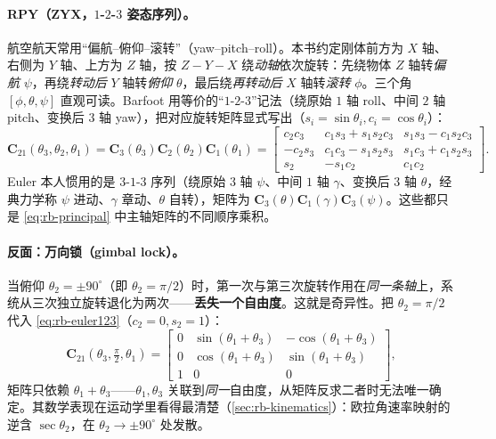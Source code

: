 \paragraph{RPY（ZYX，$1$-$2$-$3$ 姿态序列）。}航空航天常用“偏航--俯仰--滚转”（yaw--pitch--roll）。本书约定刚体前方为 $X$ 轴、右侧为 $Y$ 轴、上方为 $Z$ 轴，按 $Z\!-\!Y\!-\!X$ 绕\emph{动轴}依次旋转\cite{gaoxiang2019slam14}：先绕物体 $Z$ 轴转\emph{偏航} $\psi$，再绕\emph{转动后} $Y$ 轴转\emph{俯仰} $\theta$，最后绕\emph{再转动后} $X$ 轴转\emph{滚转} $\phi$。三个角 $[\phi,\theta,\psi]$ 直观可读。Barfoot 用等价的“$1$-$2$-$3$”记法（绕原始 $1$ 轴 roll、中间 $2$ 轴 pitch、变换后 $3$ 轴 yaw），把对应旋转矩阵显式写出\cite{barfoot2024state}（$s_i=\sin\theta_i,c_i=\cos\theta_i$）：
\begin{equation}
  \mathbf{C}_{21}(\theta_3,\theta_2,\theta_1)=\mathbf{C}_3(\theta_3)\mathbf{C}_2(\theta_2)\mathbf{C}_1(\theta_1)
  =\begin{bmatrix}
  c_2c_3 & c_1s_3+s_1s_2c_3 & s_1s_3-c_1s_2c_3\\
  -c_2s_3 & c_1c_3-s_1s_2s_3 & s_1c_3+c_1s_2s_3\\
  s_2 & -s_1c_2 & c_1c_2
  \end{bmatrix}.
  \label{eq:rb-euler123}
\end{equation}
Euler 本人惯用的是 $3$-$1$-$3$ 序列（绕原始 $3$ 轴 $\psi$、中间 $1$ 轴 $\gamma$、变换后 $3$ 轴 $\theta$，经典力学称 $\psi$ 进动、$\gamma$ 章动、$\theta$ 自转），矩阵为 $\mathbf{C}_3(\theta)\mathbf{C}_1(\gamma)\mathbf{C}_3(\psi)$。这些都只是 \cref{eq:rb-principal} 中主轴矩阵的不同顺序乘积。

\paragraph{反面：万向锁（gimbal lock）。}当俯仰 $\theta_2=\pm90^\circ$（即 $\theta_2=\pi/2$）时，第一次与第三次旋转作用在\emph{同一条轴}上，系统从三次独立旋转退化为两次——\textbf{丢失一个自由度}。这就是奇异性。把 $\theta_2=\pi/2$ 代入 \cref{eq:rb-euler123}（$c_2=0,s_2=1$）：
\begin{equation}
  \mathbf{C}_{21}(\theta_3,\tfrac{\pi}{2},\theta_1)=\begin{bmatrix}
  0&\sin(\theta_1+\theta_3)&-\cos(\theta_1+\theta_3)\\
  0&\cos(\theta_1+\theta_3)&\sin(\theta_1+\theta_3)\\
  1&0&0\end{bmatrix},
\end{equation}
矩阵只依赖 $\theta_1+\theta_3$——$\theta_1,\theta_3$ 关联到\emph{同一}自由度，从矩阵反求二者时无法唯一确定\cite{barfoot2024state}。其数学表现在运动学里看得最清楚（\cref{sec:rb-kinematics}）：欧拉角速率映射的逆含 $\sec\theta_2$，在 $\theta_2\to\pm90^\circ$ 处发散。

